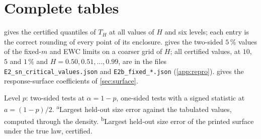 \section{Complete tables}\label{app:tables}

 gives the certified quantiles of $T_H$ at all  values of $H$ and six levels; each
entry is the correct rounding of every point of its enclosure.  gives the two-sided $5\,\%$ values of
the fixed-$m$ and EWC limits on a coarser grid of $H$; all  certified values, at $10$, $5$ and
$1\,\%$ and $H=0.50,0.51,\dots,0.99$, are in the files \texttt{E2\_sn\_critical\_values.json} and
\texttt{E2b\_fixed\_*.json} (\cref{app:repro}).  gives the response-surface coefficients of
\cref{sec:surface}.

{\small\setlength{\tabcolsep}{5pt}
}%

\begin{table}[tbp]\centering\small
\caption{Certified two-sided 5\% critical values for the periodogram and cosine tests.}\label{tab:fixedfull}
\footnotesize\setlength{\tabcolsep}{3.2pt}%
\end{table}

\begin{table}[h]\centering\small
\caption{Bartlett quantile response surfaces fitted on even grid points and checked on odd grid points.}\label{tab:surface}
\footnotesize\setlength{\tabcolsep}{4pt}%
\par\smallskip\parbox{\linewidth}{\raggedright\footnotesize Level $p$: two-sided tests at $\alpha=1-p$, one-sided tests with a signed
statistic at $a=(1-p)/2$. \textsuperscript{a}Largest held-out size error against the tabulated values, computed through the
density. \textsuperscript{b}Largest held-out size error of the printed surface under the true law, certified.}
\end{table}

\FloatBarrier
